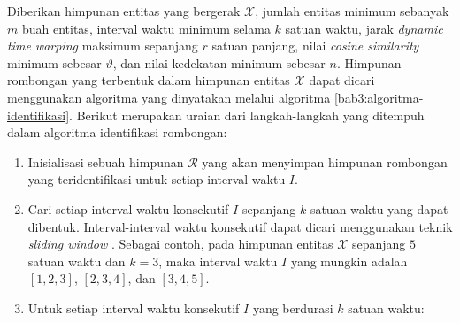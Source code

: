 Diberikan himpunan entitas yang bergerak $\mathcal{X}$, jumlah entitas minimum sebanyak $m$ buah entitas, interval waktu minimum selama $k$ satuan waktu, jarak \textit{dynamic time warping} maksimum sepanjang $r$ satuan panjang, nilai \textit{cosine similarity} minimum sebesar $\vartheta$, dan nilai kedekatan minimum sebesar $n$. Himpunan rombongan yang terbentuk dalam himpunan entitas $\mathcal{X}$ dapat dicari menggunakan algoritma yang dinyatakan melalui algoritma \ref{bab3:algoritma-identifikasi}. Berikut merupakan uraian dari langkah-langkah yang ditempuh dalam algoritma identifikasi rombongan:

\begin{enumerate}
    \item Inisialisasi sebuah himpunan $\mathcal{R}$ yang akan menyimpan himpunan rombongan yang teridentifikasi untuk setiap interval waktu $I$.
    \item Cari setiap interval waktu konsekutif $I$ sepanjang $k$ satuan waktu yang dapat dibentuk. Interval-interval waktu konsekutif dapat dicari menggunakan teknik \textit{sliding window} \cite{ralf:03:sliding-window}. Sebagai contoh, pada himpunan entitas $\mathcal{X}$ sepanjang $5$ satuan waktu dan $k = 3$, maka interval waktu $I$ yang mungkin adalah $[1, 2, 3]$, $[2, 3, 4]$, dan $[3, 4, 5]$.
    \item Untuk setiap interval waktu konsekutif $I$ yang berdurasi $k$ satuan waktu:
    

\end{enumerate}
